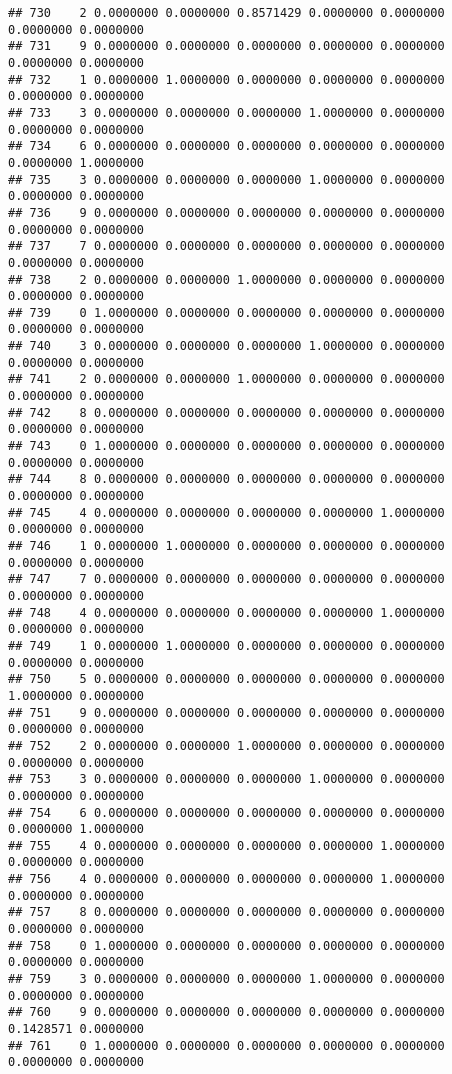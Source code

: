 \documentclass[
]{article}
\begin{document}
\begin{verbatim}
## 730    2 0.0000000 0.0000000 0.8571429 0.0000000 0.0000000 0.0000000 0.0000000
## 731    9 0.0000000 0.0000000 0.0000000 0.0000000 0.0000000 0.0000000 0.0000000
## 732    1 0.0000000 1.0000000 0.0000000 0.0000000 0.0000000 0.0000000 0.0000000
## 733    3 0.0000000 0.0000000 0.0000000 1.0000000 0.0000000 0.0000000 0.0000000
## 734    6 0.0000000 0.0000000 0.0000000 0.0000000 0.0000000 0.0000000 1.0000000
## 735    3 0.0000000 0.0000000 0.0000000 1.0000000 0.0000000 0.0000000 0.0000000
## 736    9 0.0000000 0.0000000 0.0000000 0.0000000 0.0000000 0.0000000 0.0000000
## 737    7 0.0000000 0.0000000 0.0000000 0.0000000 0.0000000 0.0000000 0.0000000
## 738    2 0.0000000 0.0000000 1.0000000 0.0000000 0.0000000 0.0000000 0.0000000
## 739    0 1.0000000 0.0000000 0.0000000 0.0000000 0.0000000 0.0000000 0.0000000
## 740    3 0.0000000 0.0000000 0.0000000 1.0000000 0.0000000 0.0000000 0.0000000
## 741    2 0.0000000 0.0000000 1.0000000 0.0000000 0.0000000 0.0000000 0.0000000
## 742    8 0.0000000 0.0000000 0.0000000 0.0000000 0.0000000 0.0000000 0.0000000
## 743    0 1.0000000 0.0000000 0.0000000 0.0000000 0.0000000 0.0000000 0.0000000
## 744    8 0.0000000 0.0000000 0.0000000 0.0000000 0.0000000 0.0000000 0.0000000
## 745    4 0.0000000 0.0000000 0.0000000 0.0000000 1.0000000 0.0000000 0.0000000
## 746    1 0.0000000 1.0000000 0.0000000 0.0000000 0.0000000 0.0000000 0.0000000
## 747    7 0.0000000 0.0000000 0.0000000 0.0000000 0.0000000 0.0000000 0.0000000
## 748    4 0.0000000 0.0000000 0.0000000 0.0000000 1.0000000 0.0000000 0.0000000
## 749    1 0.0000000 1.0000000 0.0000000 0.0000000 0.0000000 0.0000000 0.0000000
## 750    5 0.0000000 0.0000000 0.0000000 0.0000000 0.0000000 1.0000000 0.0000000
## 751    9 0.0000000 0.0000000 0.0000000 0.0000000 0.0000000 0.0000000 0.0000000
## 752    2 0.0000000 0.0000000 1.0000000 0.0000000 0.0000000 0.0000000 0.0000000
## 753    3 0.0000000 0.0000000 0.0000000 1.0000000 0.0000000 0.0000000 0.0000000
## 754    6 0.0000000 0.0000000 0.0000000 0.0000000 0.0000000 0.0000000 1.0000000
## 755    4 0.0000000 0.0000000 0.0000000 0.0000000 1.0000000 0.0000000 0.0000000
## 756    4 0.0000000 0.0000000 0.0000000 0.0000000 1.0000000 0.0000000 0.0000000
## 757    8 0.0000000 0.0000000 0.0000000 0.0000000 0.0000000 0.0000000 0.0000000
## 758    0 1.0000000 0.0000000 0.0000000 0.0000000 0.0000000 0.0000000 0.0000000
## 759    3 0.0000000 0.0000000 0.0000000 1.0000000 0.0000000 0.0000000 0.0000000
## 760    9 0.0000000 0.0000000 0.0000000 0.0000000 0.0000000 0.1428571 0.0000000
## 761    0 1.0000000 0.0000000 0.0000000 0.0000000 0.0000000 0.0000000 0.0000000

\end{verbatim}
\end{document}
